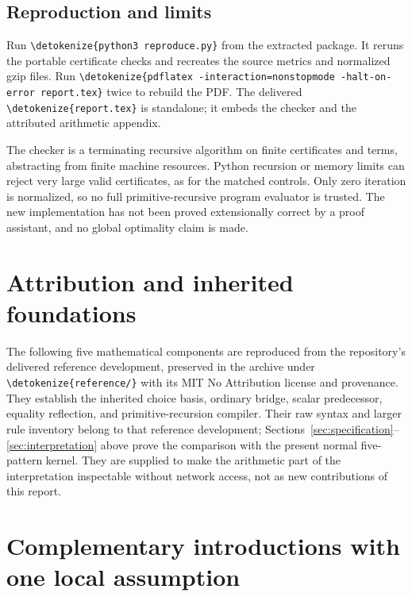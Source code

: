 \documentclass[11pt]{article}
\theoremstyle{definition}
\newcommand{\file}[1]{\expandafter\nolinkurl\expandafter{\detokenize{#1}}}
\begin{document}
\subsection{Reproduction and limits}

Run \file{python3 reproduce.py} from the extracted package. It reruns the
portable certificate checks and recreates the source metrics and normalized
gzip files. Run \file{pdflatex -interaction=nonstopmode -halt-on-error report.tex}
twice to rebuild the PDF. The delivered \file{report.tex} is standalone;
it embeds the checker and the attributed arithmetic appendix.

The checker is a terminating recursive algorithm on finite certificates
and terms, abstracting from finite machine resources. Python recursion or
memory limits can reject very large valid certificates, as for the matched
controls. Only zero iteration is normalized, so no full primitive-recursive
program evaluator is trusted. The new implementation has not been proved
extensionally correct by a proof assistant, and no global optimality claim
is made.

\appendix
\clearpage
\section*{Attribution and inherited foundations}

The following five mathematical components are reproduced from the
repository's delivered reference development, preserved in the archive
under \file{reference/} with its MIT No Attribution license and provenance.
They establish the inherited choice basis, ordinary bridge, scalar
predecessor, equality reflection, and primitive-recursion compiler. Their
raw syntax and larger rule inventory belong to that reference development;
Sections~\ref{sec:specification}--\ref{sec:interpretation} above prove the
comparison with the present normal five-pattern kernel. They are supplied
to make the arithmetic part of the interpretation inspectable without
network access, not as new contributions of this report.


\section{Complementary introductions with one local assumption}
\label{sec:choice-introduction}
\end{document}
